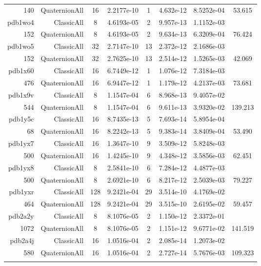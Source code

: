 \begin{xltabular}{\textwidth}{r|rcS[table-format=1.4e+2]cS[table-format=1.3e+2]S[table-format=1.4e+2]S[table-format=-1.3]}
140 & QuaternionAll & 16 & 2.2177e-10 & 1 & 4.632e-12 & 8.5252e-04 & 53.615\\  \addlinespace
pdb1wo4 & ClassicAll & 8 & 4.6193e-05 & 2 & 9.957e-13 & 1.1152e-03 & \\
152 & QuaternionAll & 8 & 4.6193e-05 & 2 & 9.634e-13 & 6.3209e-04 & 76.424\\  \addlinespace
pdb1wo5 & ClassicAll & 32 & 2.7147e-10 & 13 & 2.372e-12 & 2.1686e-03 & \\
152 & QuaternionAll & 32 & 2.7625e-10 & 13 & 2.514e-12 & 1.5265e-03 & 42.069\\  \addlinespace
pdb1x60 & ClassicAll & 16 & 6.7449e-12 & 1 & 1.076e-12 & 7.3184e-03 & \\
476 & QuaternionAll & 16 & 6.9447e-12 & 1 & 1.179e-12 & 4.2137e-03 & 73.681\\  \addlinespace
pdb1x9v & ClassicAll & 8 & 1.1547e-04 & 6 & 8.968e-13 & 9.4057e-02 & \\
544 & QuaternionAll & 8 & 1.1547e-04 & 6 & 9.611e-13 & 3.9320e-02 & 139.213\\  \addlinespace
pdb1y5c & ClassicAll & 16 & 8.7435e-13 & 5 & 7.693e-14 & 5.8954e-04 & \\
68 & QuaternionAll & 16 & 8.2242e-13 & 5 & 9.383e-14 & 3.8409e-04 & 53.490\\  \addlinespace
pdb1yx7 & ClassicAll & 16 & 1.3647e-10 & 9 & 3.509e-12 & 5.8248e-03 & \\
500 & QuaternionAll & 16 & 1.4245e-10 & 9 & 4.348e-12 & 3.5856e-03 & 62.451\\  \addlinespace
pdb1yx8 & ClassicAll & 8 & 2.5841e-10 & 6 & 7.284e-12 & 4.4877e-03 & \\
500 & QuaternionAll & 8 & 2.6921e-10 & 6 & 8.217e-12 & 2.5039e-03 & 79.227\\  \addlinespace
pdb1yxr & ClassicAll & 128 & 9.2421e-04 & 29 & 3.514e-10 & 4.1769e-02 & \\
464 & QuaternionAll & 128 & 9.2421e-04 & 29 & 3.515e-10 & 2.6195e-02 & 59.457\\  \addlinespace
pdb2a2y & ClassicAll & 8 & 8.1076e-05 & 2 & 1.150e-12 & 2.3372e-01 & \\
1072 & QuaternionAll & 8 & 8.1076e-05 & 2 & 1.151e-12 & 9.6771e-02 & 141.519\\  \addlinespace
pdb2a4j & ClassicAll & 16 & 1.0516e-04 & 2 & 2.085e-14 & 1.2073e-02 & \\
580 & QuaternionAll & 16 & 1.0516e-04 & 2 & 2.727e-14 & 5.7676e-03 & 109.323\\  \addlinespace

\end{xltabular}
